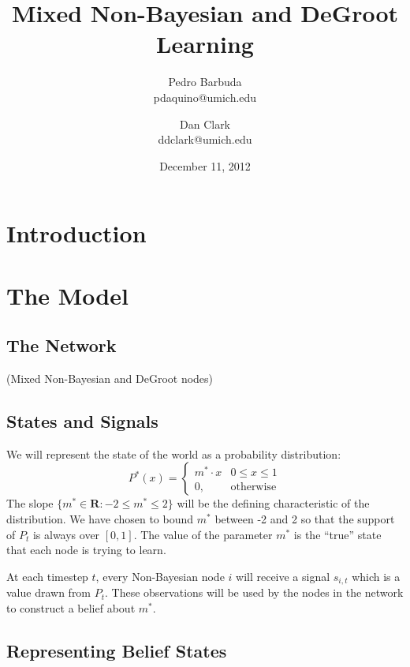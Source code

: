 \documentclass[a4paper,12pt]{article}
\begin{document}
\title{Mixed Non-Bayesian and DeGroot Learning}
\author{Pedro Barbuda\\pdaquino@umich.edu \and Dan Clark\\ddclark@umich.edu}
\date{December 11, 2012}

\maketitle

\section{Introduction}

\section{The Model}

\subsection{The Network}

(Mixed Non-Bayesian and DeGroot nodes)

\subsection{States and Signals}

We will represent the state of the world as a probability distribution:
\begin{equation}
P^*(x)=\begin{cases}
m^* \cdot x & 0 \le x \le 1 \\
0, & \text{otherwise}
\end{cases}
\end{equation}
The slope $\{ m^* \in \mathbf{R} : -2 \le m^* \le 2 \}$ will be the defining characteristic of the distribution.  We have chosen to bound $m^*$ between -2 and 2 so that the support of $P_t$  is always over $[0,1]$.  The value of the parameter $m^*$ is the ``true'' state that each node is trying to learn.

At each timestep $t$, every Non-Bayesian node $i$ will receive a signal $s_{i,t}$ which is a value drawn from $P_t$.  These observations will be used by the nodes in the network to construct a belief about $m^*$.

\subsection{Representing Belief States}
\end{document}
